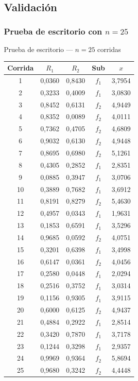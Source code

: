 \subsection{Validación}

\subsubsection{\texorpdfstring{Prueba de escritorio con $n=25$}{Prueba de escritorio con n=25}}

\begin{mitabla}[H]{\texorpdfstring{Prueba de escritorio — $n=25$ corridas}{Prueba de escritorio - n=25 corridas}}
\small
\begin{tabular}{ccccc}
\toprule
Corrida & $R_1$ & $R_2$ & Sub & $x$ \\
\midrule
1  & 0,0360 & 0,8430 & $f_1$ & 3,7954 \\
2  & 0,3233 & 0,4009 & $f_1$ & 3,0830 \\
3  & 0,8452 & 0,6131 & $f_2$ & 4,9449 \\
4  & 0,8352 & 0,0089 & $f_2$ & 4,0111 \\
5  & 0,7362 & 0,4705 & $f_2$ & 4,6809 \\
6  & 0,9032 & 0,6130 & $f_2$ & 4,9448 \\
7  & 0,8695 & 0,6980 & $f_2$ & 5,1261 \\
8  & 0,4305 & 0,2852 & $f_1$ & 2,8351 \\
9  & 0,0885 & 0,3947 & $f_1$ & 3,0706 \\
10 & 0,3889 & 0,7682 & $f_1$ & 3,6912 \\
11 & 0,8191 & 0,8279 & $f_2$ & 5,4630 \\
12 & 0,4957 & 0,0343 & $f_1$ & 1,9631 \\
13 & 0,1853 & 0,6591 & $f_1$ & 3,5296 \\
14 & 0,9685 & 0,0592 & $f_2$ & 4,0751 \\
15 & 0,3201 & 0,6398 & $f_1$ & 3,4998 \\
16 & 0,6147 & 0,0361 & $f_2$ & 4,0456 \\
17 & 0,2580 & 0,0448 & $f_1$ & 2,0294 \\
18 & 0,2516 & 0,3752 & $f_1$ & 3,0314 \\
19 & 0,1156 & 0,9305 & $f_1$ & 3,9115 \\
20 & 0,6000 & 0,6125 & $f_2$ & 4,9437 \\
21 & 0,4884 & 0,2922 & $f_1$ & 2,8514 \\
22 & 0,3420 & 0,7870 & $f_1$ & 3,7178 \\
23 & 0,1244 & 0,3298 & $f_1$ & 2,9357 \\
24 & 0,9969 & 0,9364 & $f_2$ & 5,8694 \\
25 & 0,9680 & 0,3242 & $f_2$ & 4,4448 \\
\bottomrule
\end{tabular}
\end{mitabla}

